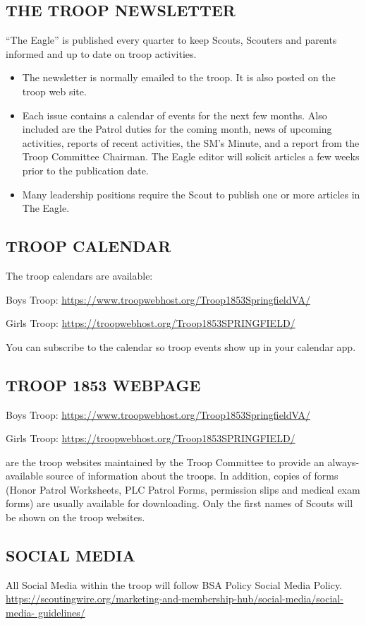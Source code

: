 \documentclass{ltxguide}
\begin{document}
\subsection{THE TROOP NEWSLETTER}
“The Eagle” is published every quarter to keep Scouts, Scouters and parents informed and up to date on troop activities.

\begin{itemize}
	\item The newsletter is normally emailed to the troop. It is also posted on the troop web site.
	\item Each issue contains a calendar of events for the next few months. Also included are the Patrol duties for the coming month, news of upcoming activities, reports of recent activities, the \ac{SM}'s Minute, and a report from the Troop Committee Chairman. The Eagle editor will solicit articles a few weeks prior to the publication date. 
	\item Many leadership positions require the Scout to publish one or more articles in The Eagle.
\end{itemize}

\subsection{TROOP CALENDAR}
The troop calendars are available:

Boys Troop: \url{https://www.troopwebhost.org/Troop1853SpringfieldVA/}

Girls Troop: \url{https://troopwebhost.org/Troop1853SPRINGFIELD/}

You can subscribe to the calendar so troop events show up in your calendar app. 

\subsection{TROOP 1853 WEBPAGE}
Boys Troop: \url{https://www.troopwebhost.org/Troop1853SpringfieldVA/}

Girls Troop: \url{https://troopwebhost.org/Troop1853SPRINGFIELD/}

are the troop websites maintained by the Troop Committee to provide an always- available source of information about the troops. In addition, copies of forms (Honor Patrol Worksheets, \ac{PLC} Patrol Forms, permission slips and medical exam forms) are usually available for downloading. Only the first names of Scouts will be shown on the troop  websites.

\subsection{SOCIAL MEDIA}
All Social Media within the troop will follow \ac{BSA} Policy Social Media Policy. 
\url{https://scoutingwire.org/marketing-and-membership-hub/social-media/social-media- guidelines/}
\end{document}
